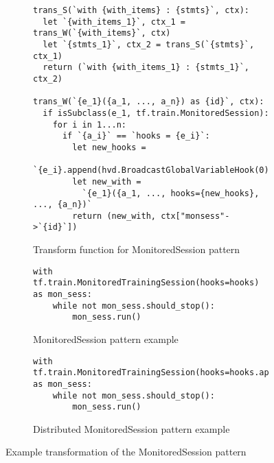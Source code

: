 \begin{figure}[ht!]
  \centering
  \begin{subfigure}{1\textwidth}
  \begin{lstlisting}[style=mpython]
trans_S(`with {with_items} : {stmts}`, ctx):
  let `{with_items_1}`, ctx_1 = trans_W(`{with_items}`, ctx)
  let `{stmts_1}`, ctx_2 = trans_S(`{stmts}`, ctx_1)
  return (`with {with_items_1} : {stmts_1}`, ctx_2) 

trans_W(`{e_1}({a_1, ..., a_n}) as {id}`, ctx):
  if isSubclass(e_1, tf.train.MonitoredSession):
    for i in 1...n:
	  if `{a_i}` == `hooks = {e_i}`:
	    let new_hooks = 
          `{e_i}.append(hvd.BroadcastGlobalVariableHook(0))`
        let new_with = 
          `{e_1}({a_1, ..., hooks={new_hooks}, ..., {a_n})` 
        return (new_with, ctx["monsess"->`{id}`])
  \end{lstlisting}
  \caption{Transform function for MonitoredSession pattern}
  \label{fig:trans:monsesstrans:fn}
  \end{subfigure}

  \begin{subfigure}[t]{1\textwidth}
    \begin{lstlisting}[style=mpython]
with tf.train.MonitoredTrainingSession(hooks=hooks) as mon_sess:
    while not mon_sess.should_stop():
        mon_sess.run()\end{lstlisting}
    \caption{MonitoredSession pattern example}
    \label{fig:trans:monsesstrans:a}
  \end{subfigure}
  \hspace{5mm}
  \begin{subfigure}[t]{1\textwidth}
    \begin{lstlisting}[style=mpython]
with tf.train.MonitoredTrainingSession(hooks=hooks.append(hvd.BroadcastGlobalVariablesHook(0)) as mon_sess:
    while not mon_sess.should_stop():
        mon_sess.run()\end{lstlisting}
    \caption{Distributed MonitoredSession pattern example}
    \label{fig:trans:monsesstrans:b}
  \end{subfigure}
  \caption{Example transformation of the MonitoredSession pattern}
  \label{fig:trans:monsesstrans}
\end{figure}


